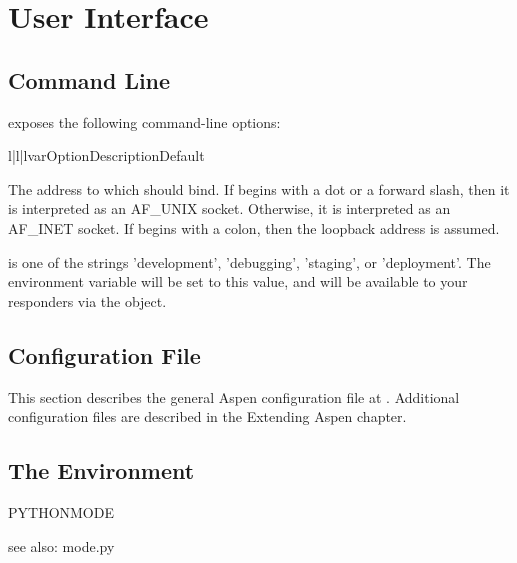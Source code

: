 \chapter{User Interface \label{interface}}

\section{Command Line \label{command-line}}

 exposes the following command-line options:

\begin{tableiii}{l|l|l}{var}{Option}{Description}{Default}

    {The address to which  should bind. If  begins
    with a dot or a forward slash, then it is interpreted as an AF_UNIX socket.
    Otherwise, it is interpreted as an AF_INET socket. If  begins
    with a colon, then the loopback address is assumed.} {}

    { is one of the strings 'development', 'debugging', 'staging', or
    'deployment'.  The  environment variable will be set to
    this value, and will be available to your responders via the
     object.} {}

\end{tableiii}


\section{Configuration File \label{config-file}}

This section describes the general Aspen configuration file at
. Additional configuration files are described in the
Extending Aspen chapter.


\section{The Environment \label{environment}}

PYTHONMODE

see also: mode.py
